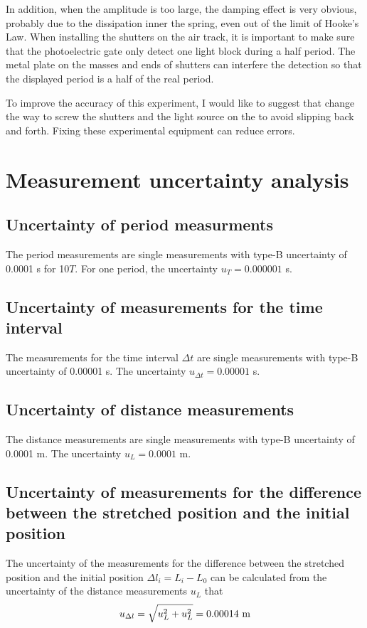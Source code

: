 \documentclass[a4paper]{report}
\begin{document}
	In addition, when the amplitude is too large, the damping effect is very obvious, probably due to the dissipation inner the spring, even out of the limit of Hooke's Law. When installing the shutters on the air track, it is important to make sure that the photoelectric gate only detect one light block during a half period. The metal plate on the masses and ends of shutters can interfere the detection so that the displayed period is a half of the real period.
	
	To improve the accuracy of this experiment, I would like to suggest that change the way to screw the shutters and the light source on the to avoid slipping back and forth. Fixing these experimental equipment can reduce errors.
	\newpage
	\renewcommand\thesection{\Alph{section}}
	\setcounter{section}{0}
	\section{Measurement uncertainty analysis}
	\subsection{Uncertainty of period measurments}
	The period measurements are single measurements with type-B uncertainty of 0.0001 s for 10$T$. For one period, the uncertainty $u_T=0.000001$ s.
	\subsection{Uncertainty of measurements for the time interval}
	The measurements for the time interval $\Delta t$ are single measurements with type-B uncertainty of 0.00001 s. The uncertainty $u_{\Delta t}=0.00001$ s.
	\subsection{Uncertainty of distance measurements}
	The distance measurements are single measurements with type-B uncertainty of 0.0001 m. The uncertainty $u_L=0.0001$ m.
	\subsection{Uncertainty of measurements for the difference between the stretched position and the initial position}
	The uncertainty of the measurements for the difference between the stretched position and the initial position $\Delta l_i=L_i-L_0$ can be calculated from the uncertainty of the distance measurements $u_L$ that
	\begin{equation*}
	u_{\Delta l}=\sqrt{u_L^2+u_L^2}=0.00014\ \rm{m}
	\end{equation*}
\end{document}
